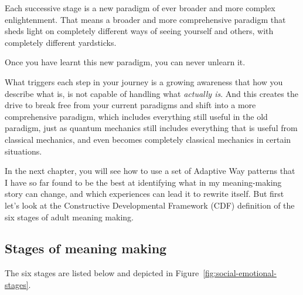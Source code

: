 Each successive stage is a new paradigm of ever broader and more complex enlightenment. That means a broader and more comprehensive paradigm that sheds light on completely different ways of seeing yourself and others, with completely different yardsticks. 


Once you have learnt this new paradigm, you can never unlearn it.


What triggers each step in your journey is a growing awareness that how you describe what is, is not capable of handling what \emph{actually is}. And this creates the drive to break free from your current paradigms and shift into a more comprehensive paradigm, which includes everything still useful in the old paradigm, just as quantum mechanics still includes everything that is useful from classical mechanics, and even becomes completely classical mechanics in certain situations. 


In the next chapter, you will see how to use a set of Adaptive Way patterns that I have so far found to be the best at identifying what in my meaning-making story can change, and which experiences can lead it to rewrite itself. But first let's look at the Constructive Developmental Framework (CDF) definition of the six stages of adult meaning making.
\subsection{Stages of meaning making}
\label{section:dev-stages}


The six stages are listed below and depicted in Figure~\ref{fig:social-emotional-stages}. 


